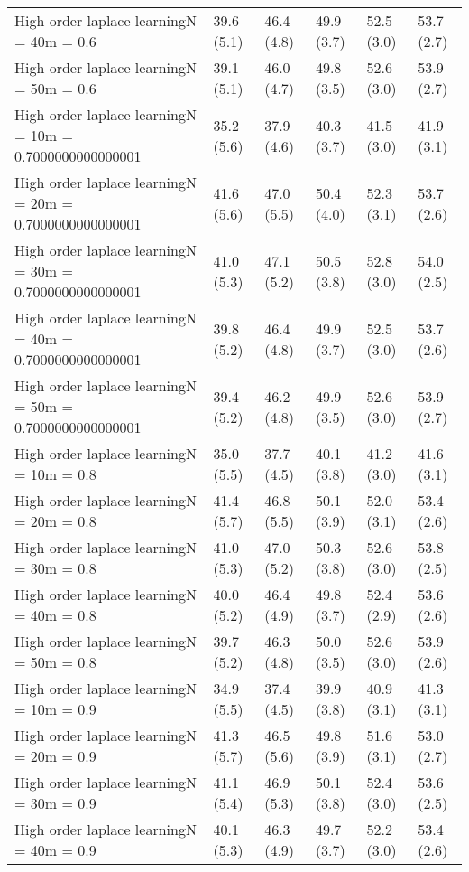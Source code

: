 \documentclass{article}
\begin{document}
\begin{table*}[t!]
\begin{center}
\begin{small}
\begin{sc}
\begin{tabular}{llllll}
High order laplace learningN = 40m = 0.6&39.6 (5.1)      &46.4 (4.8)      &49.9 (3.7)      &52.5 (3.0)      &53.7 (2.7)      \\
High order laplace learningN = 50m = 0.6&39.1 (5.1)      &46.0 (4.7)      &49.8 (3.5)      &52.6 (3.0)      &53.9 (2.7)      \\
High order laplace learningN = 10m = 0.7000000000000001&35.2 (5.6)      &37.9 (4.6)      &40.3 (3.7)      &41.5 (3.0)      &41.9 (3.1)      \\
High order laplace learningN = 20m = 0.7000000000000001&41.6 (5.6)      &47.0 (5.5)      &50.4 (4.0)      &52.3 (3.1)      &53.7 (2.6)      \\
High order laplace learningN = 30m = 0.7000000000000001&41.0 (5.3)      &47.1 (5.2)      &50.5 (3.8)      &52.8 (3.0)      &54.0 (2.5)      \\
High order laplace learningN = 40m = 0.7000000000000001&39.8 (5.2)      &46.4 (4.8)      &49.9 (3.7)      &52.5 (3.0)      &53.7 (2.6)      \\
High order laplace learningN = 50m = 0.7000000000000001&39.4 (5.2)      &46.2 (4.8)      &49.9 (3.5)      &52.6 (3.0)      &53.9 (2.7)      \\
High order laplace learningN = 10m = 0.8&35.0 (5.5)      &37.7 (4.5)      &40.1 (3.8)      &41.2 (3.0)      &41.6 (3.1)      \\
High order laplace learningN = 20m = 0.8&41.4 (5.7)      &46.8 (5.5)      &50.1 (3.9)      &52.0 (3.1)      &53.4 (2.6)      \\
High order laplace learningN = 30m = 0.8&41.0 (5.3)      &47.0 (5.2)      &50.3 (3.8)      &52.6 (3.0)      &53.8 (2.5)      \\
High order laplace learningN = 40m = 0.8&40.0 (5.2)      &46.4 (4.9)      &49.8 (3.7)      &52.4 (2.9)      &53.6 (2.6)      \\
High order laplace learningN = 50m = 0.8&39.7 (5.2)      &46.3 (4.8)      &50.0 (3.5)      &52.6 (3.0)      &53.9 (2.6)      \\
High order laplace learningN = 10m = 0.9&34.9 (5.5)      &37.4 (4.5)      &39.9 (3.8)      &40.9 (3.1)      &41.3 (3.1)      \\
High order laplace learningN = 20m = 0.9&41.3 (5.7)      &46.5 (5.6)      &49.8 (3.9)      &51.6 (3.1)      &53.0 (2.7)      \\
High order laplace learningN = 30m = 0.9&41.1 (5.4)      &46.9 (5.3)      &50.1 (3.8)      &52.4 (3.0)      &53.6 (2.5)      \\
High order laplace learningN = 40m = 0.9&40.1 (5.3)      &46.3 (4.9)      &49.7 (3.7)      &52.2 (3.0)      &53.4 (2.6)      \\

\end{tabular}
\end{sc}
\end{small}
\end{center}
\end{table*}
\end{document}
